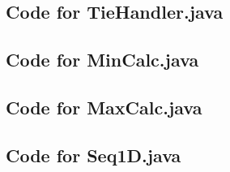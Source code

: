 \documentclass[12pt,fleqn]{examtst}
\begin{document}
\newpage

\subsection*{Code for TieHandler.java}

\noindent 

\newpage

\subsection*{Code for MinCalc.java}

\noindent 

\newpage

\subsection*{Code for MaxCalc.java}

\noindent 

\newpage

\subsection*{Code for Seq1D.java}

\noindent 

\newpage

\end{document}
